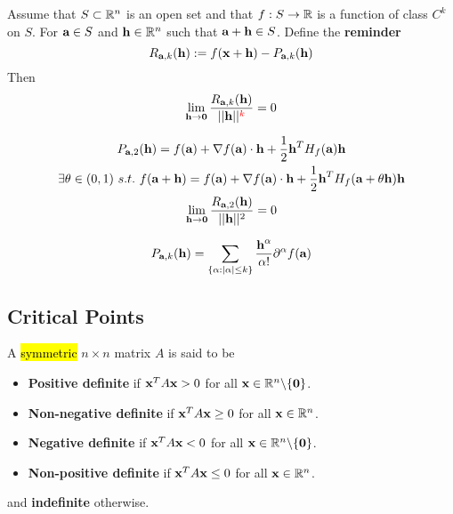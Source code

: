 \documentclass[11pt]{article}
\begin{document}
			\begin{theorem}
				Assume that $S \subset \mathbb{R}^n$ is an open set and that $f: S \to \mathbb{R}$ is a function of class $C^k$ on $S$. For $\textbf{a} \in S$ and $\textbf{h} \in \mathbb{R}^n$ such that $\textbf{a} + \textbf{h} \in S$. Define the \textbf{reminder}
				\begin{equation}
					R_{\textbf{a}, k}(\textbf{h}) := f(\textbf{x} + \textbf{h}) - P_{\textbf{a}, k}(\textbf{h})
				\end{equation}
				Then 
				\begin{equation}
					\lim_{\textbf{h} \to \textbf{0}} \frac{R_{\textbf{a}, k}(\textbf{h})}{\vert \vert {\textbf{h}} \vert \vert^{\textcolor{red}{k}}} = 0
				\end{equation}
			\end{theorem}
			
			\begin{theorem}
				\begin{gather}
					P_{\textbf{a}, 2}(\textbf{h}) = f(\textbf{a}) + \nabla f(\textbf{a}) \cdot \textbf{h} + \frac{1}{2} \textbf{h}^T H_f(\textbf{a}) \textbf{h} \\
					\exists \theta \in (0, 1)\ s.t.\ f(\textbf{a}+\textbf{h}) = f(\textbf{a}) + \nabla f(\textbf{a}) \cdot \textbf{h} + \frac{1}{2} \textbf{h}^T H_f(\textbf{a} + \theta \textbf{h}) \textbf{h} \\
					\lim_{\textbf{h} \to \textbf{0}} \frac{R_{\textbf{a}, 2}(\textbf{h})}{\vert \vert {\textbf{h}} \vert \vert^2} = 0
				\end{gather}
			\end{theorem}
			
			\begin{definition}
				\begin{equation}
					P_{\textbf{a}, k}(\textbf{h}) = \sum_{\{\alpha : |\alpha| \leq k\}}\frac {\textbf{h}^\alpha}{\alpha!}{\partial^\alpha f(\textbf{a})}
				\end{equation}
			\end{definition}
			
		\subsection{Critical Points}
			\begin{definition}
				A \hl{symmetric} $n \times n$ matrix $A$ is said to be
				\begin{itemize}
					\item \textbf{Positive definite} if $\textbf{x}^T A \textbf{x} > 0$ for all $\textbf{x} \in \mathbb{R}^n \backslash \{\textbf{0}\}$.
					\item \textbf{Non-negative definite} if $\textbf{x}^T A \textbf{x} \geq 0$ for all $\textbf{x} \in \mathbb{R}^n$.
					\item \textbf{Negative definite} if $\textbf{x}^T A \textbf{x} < 0$ for all $\textbf{x} \in \mathbb{R}^n \backslash \{\textbf{0}\}$.
					\item \textbf{Non-positive definite} if $\textbf{x}^T A \textbf{x} \leq 0$ for all $\textbf{x} \in \mathbb{R}^n$.
				\end{itemize}
				and \textbf{indefinite} otherwise.
			\end{definition}
			
\end{document}
